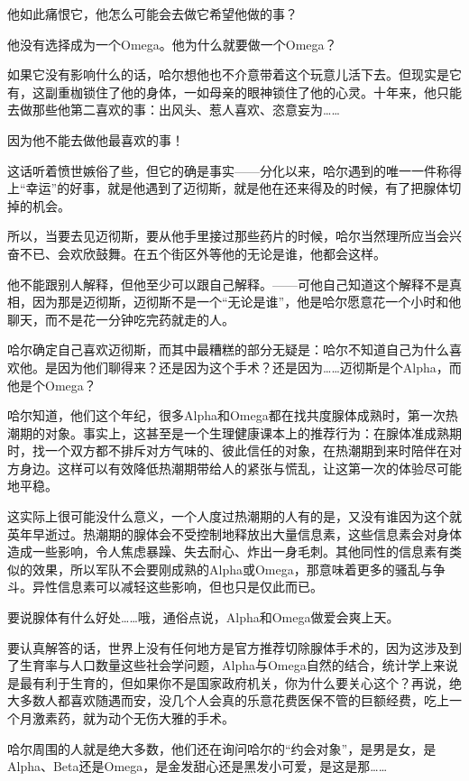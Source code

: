 \documentclass[../main]{subfiles}
\begin{document}
他如此痛恨它，他怎么可能会去做它希望他做的事？

他没有选择成为一个Omega。他为什么就要做一个Omega？

如果它没有影响什么的话，哈尔想他也不介意带着这个玩意儿活下去。但现实是它有，这副重枷锁住了他的身体，一如母亲的眼神锁住了他的心灵。十年来，他只能去做那些他第二喜欢的事：出风头、惹人喜欢、恣意妄为……

因为他不能去做他最喜欢的事！

这话听着愤世嫉俗了些，但它的确是事实——分化以来，哈尔遇到的唯一一件称得上“幸运”的好事，就是他遇到了迈彻斯，就是他在还来得及的时候，有了把腺体切掉的机会。

所以，当要去见迈彻斯，要从他手里接过那些药片的时候，哈尔当然理所应当会兴奋不已、会欢欣鼓舞。在五个街区外等他的无论是谁，他都会这样。

他不能跟别人解释，但他至少可以跟自己解释。——可他自己知道这个解释不是真相，因为那是迈彻斯，迈彻斯不是一个“无论是谁”，他是哈尔愿意花一个小时和他聊天，而不是花一分钟吃完药就走的人。

哈尔确定自己喜欢迈彻斯，而其中最糟糕的部分无疑是：哈尔不知道自己为什么喜欢他。是因为他们聊得来？还是因为这个手术？还是因为……迈彻斯是个Alpha，而他是个Omega？

哈尔知道，他们这个年纪，很多Alpha和Omega都在找共度腺体成熟时，第一次热潮期的对象。事实上，这甚至是一个生理健康课本上的推荐行为：在腺体准成熟期时，找一个双方都不排斥对方气味的、彼此信任的对象，在热潮期到来时陪伴在对方身边。这样可以有效降低热潮期带给人的紧张与慌乱，让这第一次的体验尽可能地平稳。

这实际上很可能没什么意义，一个人度过热潮期的人有的是，又没有谁因为这个就英年早逝过。热潮期的腺体会不受控制地释放出大量信息素，这些信息素会对身体造成一些影响，令人焦虑暴躁、失去耐心、炸出一身毛刺。其他同性的信息素有类似的效果，所以军队不会要刚成熟的Alpha或Omega，那意味着更多的骚乱与争斗。异性信息素可以减轻这些影响，但也只是仅此而已。

要说腺体有什么好处……哦，通俗点说，Alpha和Omega做爱会爽上天。

要认真解答的话，世界上没有任何地方是官方推荐切除腺体手术的，因为这涉及到了生育率与人口数量这些社会学问题，Alpha与Omega自然的结合，统计学上来说是最有利于生育的，但如果你不是国家政府机关，你为什么要关心这个？再说，绝大多数人都喜欢随遇而安，没几个人会真的乐意花费医保不管的巨额经费，吃上一个月激素药，就为动个无伤大雅的手术。

哈尔周围的人就是绝大多数，他们还在询问哈尔的“约会对象”，是男是女，是Alpha、Beta还是Omega，是金发甜心还是黑发小可爱，是这是那……
\end{document}
